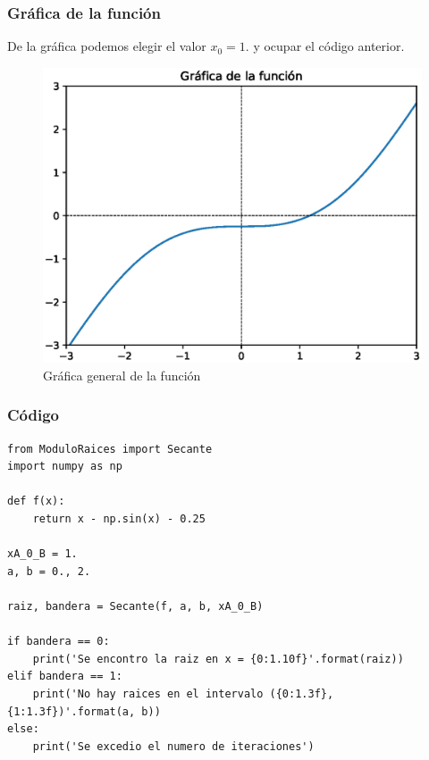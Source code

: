 \begin{frame}
\frametitle{Gráfica de la función}
De la gráfica podemos elegir el valor $x_{0} = 1.$ y ocupar el código anterior.
\begin{figure}[h!]
	\centering
	\includegraphics[scale=0.4]{Imagenes/raices_secante_01.eps}
	\caption{Gráfica general de la función}
\end{figure}
\end{frame}
\begin{frame}
\frametitle{Código}
\begin{lstlisting}[caption=Código para la solución con el método de la secante, style=codigopython]
from ModuloRaices import Secante
import numpy as np

def f(x):
    return x - np.sin(x) - 0.25

xA_0_B = 1.
a, b = 0., 2.

raiz, bandera = Secante(f, a, b, xA_0_B)
    
if bandera == 0:
    print('Se encontro la raiz en x = {0:1.10f}'.format(raiz))
elif bandera == 1:
    print('No hay raices en el intervalo ({0:1.3f}, {1:1.3f})'.format(a, b))
else:
	print('Se excedio el numero de iteraciones')
\end{lstlisting}
\end{frame}
